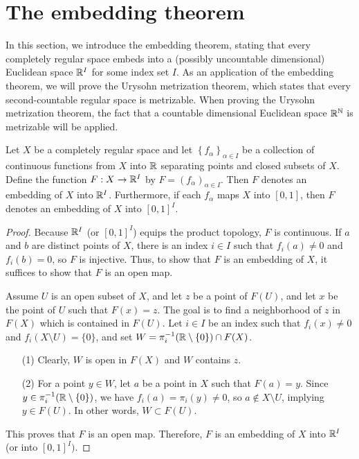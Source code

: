 \section{The embedding theorem}

In this section, we introduce the embedding theorem, stating that every completely regular space embeds into a (possibly uncountable dimensional) Euclidean space ${\mathbb{R}}^I$ for some index set $I$.
As an application of the embedding theorem, we will prove the Urysohn metrization theorem, which states that every second-countable regular space is metrizable.
When proving the Urysohn metrization theorem, the fact that a countable dimensional Euclidean space ${\mathbb{R}}^{\mathbb{N}}$ is metrizable will be applied.

\begin{thm}
    Let $X$ be a completely regular space and let $\left\{f_\alpha\right\}_{\alpha\in I}$ be a collection of continuous functions from $X$ into ${\mathbb{R}}$ separating points and closed subsets of $X$.
    Define the function $F: X\rightarrow{\mathbb{R}}^I$ by $F=(f_\alpha)_{\alpha\in I}$.
    Then $F$ denotes an embedding of $X$ into ${\mathbb{R}}^I$.
    Furthermore, if each $f_\alpha$ maps $X$ into $[0, 1]$, then $F$ denotes an embedding of $X$ into $[0, 1]^I$.
\end{thm}
\begin{proof}
    Because ${\mathbb{R}}^I$ (or $[0, 1]^I$) equips the product topology, $F$ is continuous.
    If $a$ and $b$ are distinct points of $X$, there is an index $i\in I$ such that $f_i(a)\neq 0$ and $f_i(b)=0$, so $F$ is injective.
    Thus, to show that $F$ is an embedding of $X$, it suffices to show that $F$ is an open map.
    
    Assume $U$ is an open subset of $X$, and let $z$ be a point of $F(U)$, and let $x$ be the point of $U$ such that $F(x)=z$.
    The goal is to find a neighborhood of $z$ in $F(X)$ which is contained in $F(U)$.
    Let $i\in I$ be an index such that $f_i(x)\neq 0$ and $f_i(X\setminus U)=\{0\}$, and set $W=\pi_i^{-1}({\mathbb{R}}\setminus\{0\})\cap F(X)$.
    \begin{enumerate}
        \item[(1)]
        {
            Clearly, $W$ is open in $F(X)$ and $W$ contains $z$.
        }
        \item[(2)]
        {
            For a point $y\in W$, let $a$ be a point in $X$ such that $F(a)=y$.
            Since $y\in\pi_i^{-1}({\mathbb{R}}\setminus\{0\})$, we have $f_i(a)=\pi_i(y)\neq 0$, so $a\notin X\setminus U$, implying $y\in F(U)$.
            In other words, $W\subset F(U)$.
        }
    \end{enumerate}
    This proves that $F$ is an open map.
    Therefore, $F$ is an embedding of $X$ into ${\mathbb{R}}^I$ (or into $[0, 1]^I)$.
\end{proof}

